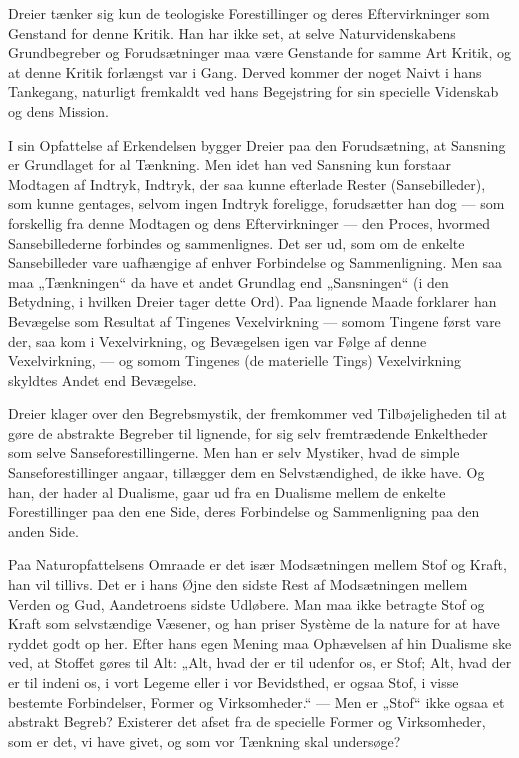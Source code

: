 \documentclass[12pt,a4paper,openany]{book}
\newcommand{\opage}[1]{\marginnote{\footnotesize\textit{[#1]}}}
\begin{document}
Dreier tænker sig kun de teologiske Forestillinger og deres Eftervirkninger som
Genstand for denne Kritik. Han har ikke set, at selve Naturvidenskabens
Grundbegreber og Forudsætninger maa være Genstande for samme Art Kritik, og at
denne Kritik forlængst var i Gang. Derved kommer der noget Naivt i hans
Tankegang, naturligt fremkaldt ved hans Begejstring for sin specielle Videnskab
og dens Mission.

I sin Opfattelse af Erkendelsen bygger Dreier paa den Forudsætning, at Sansning
er Grundlaget for al Tænkning. Men idet han ved Sansning kun forstaar Modtagen
af Indtryk, Indtryk, der saa kunne efterlade Rester (Sansebilleder), som kunne
gentages, selvom ingen Indtryk foreligge, forudsætter han dog --- som
forskellig fra denne Modtagen og dens
\setcounter{footnote}{0}%
\opage{179}Eftervirkninger --- den Proces, hvormed Sansebillederne forbindes og
sammenlignes. Det ser ud, som om de enkelte Sansebilleder vare uafhængige af
enhver Forbindelse og Sammenligning. Men saa maa „Tænkningen“ da have et andet
Grundlag end „Sansningen“ (i den Betydning, i hvilken Dreier tager dette Ord).
Paa lignende Maade forklarer han Bevægelse som Resultat af Tingenes
Vexelvirkning --- somom Tingene først vare der, saa kom i Vexelvirkning, og
Bevægelsen igen var Følge af denne Vexelvirkning, --- og somom Tingenes (de
materielle Tings) Vexelvirkning skyldtes Andet end Bevægelse.

Dreier klager over den Begrebsmystik, der fremkommer ved Tilbøjeligheden til at
gøre de abstrakte Begreber til lignende, for sig selv fremtrædende Enkeltheder
som selve Sanseforestillingerne. Men han er selv Mystiker, hvad de simple
Sanseforestillinger angaar, tillægger dem en Selvstændighed, de ikke have. Og
han, der hader al Dualisme, gaar ud fra en Dualisme mellem de enkelte
Forestillinger paa den ene Side, deres Forbindelse og Sammenligning paa den
anden Side.

Paa Naturopfattelsens Omraade er det især Modsætningen mellem Stof og Kraft,
han vil tillivs. Det er i hans Øjne den sidste Rest af Modsætningen mellem
Verden og Gud, Aandetroens sidste Udløbere. Man maa ikke betragte Stof og Kraft
som selvstændige Væsener, og han priser Système de la nature for at have ryddet
godt op her. Efter hans egen Mening maa Ophævelsen af hin Dualisme ske ved, at
Stoffet gøres til Alt: „Alt, hvad der er til udenfor os, er Stof; Alt, hvad der
er til indeni os, i vort Legeme eller i vor Bevidsthed, er ogsaa Stof, i visse
bestemte Forbindelser, Former og Virksomheder.“ --- Men er „Stof“ ikke ogsaa et
abstrakt Begreb? Existerer det afset fra de specielle Former og Virksomheder,
som er det, vi have givet, og som vor Tænkning skal undersøge?
\end{document}
